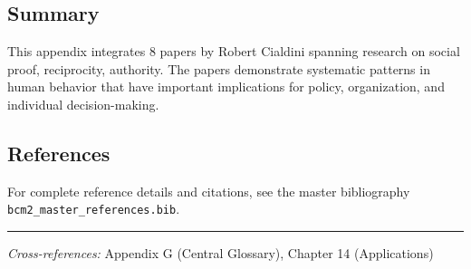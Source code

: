 \subsection{Summary}

This appendix integrates 8 papers by Robert Cialdini
spanning research on social proof, reciprocity, authority.
The papers demonstrate systematic patterns in human behavior that have important
implications for policy, organization, and individual decision-making.

\subsection{References}

For complete reference details and citations, see the master bibliography
\texttt{bcm2\_master\_references.bib}.

\vspace{1em}
\hrule
\vspace{0.5em}

\noindent\textit{Cross-references:}
Appendix G (Central Glossary), Chapter 14 (Applications)
